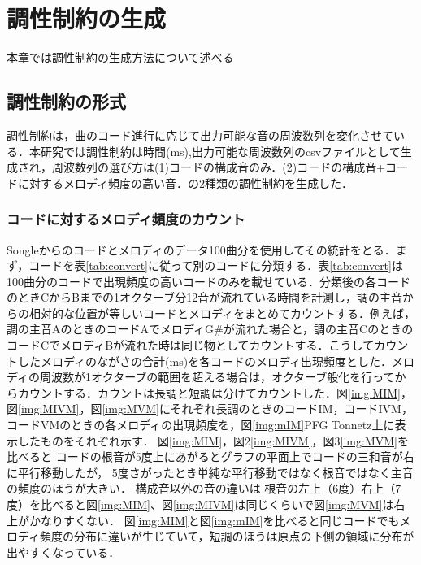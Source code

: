 \chapter{調性制約の生成}
本章では調性制約の生成方法について述べる
\section{調性制約の形式}
調性制約は，曲のコード進行に応じて出力可能な音の周波数列を変化させている．本研究では調性制約は時間(ms),出力可能な周波数列のcsvファイルとして生成され，周波数列の選び方は(1)コードの構成音のみ．(2)コードの構成音+コードに対するメロディ頻度の高い音．の2種類の調性制約を生成した．
\subsection{コードに対するメロディ頻度のカウント}
Songleからのコードとメロディのデータ100曲分を使用してその統計をとる．まず，コードを表\ref{tab:convert}に従って別のコードに分類する．表\ref{tab:convert}は100曲分のコードで出現頻度の高いコードのみを載せている．分類後の各コードのときCからBまでの1オクターブ分12音が流れている時間を計測し，調の主音からの相対的な位置が等しいコードとメロディをまとめてカウントする．例えば，調の主音AのときのコードAでメロディG\#が流れた場合と，調の主音CのときのコードCでメロディBが流れた時は同じ物としてカウントする．こうしてカウントしたメロディのながさの合計(ms)を各コードのメロディ出現頻度とした．メロディの周波数が1オクターブの範囲を超える場合は，オクターブ般化を行ってからカウントする．カウントは長調と短調は分けてカウントした．図\ref{img:MIM}，図\ref{img:MIVM}，図\ref{img:MVM}にそれぞれ長調のときのコードIM，コードIVM，コードVMのときの各メロディの出現頻度を，図\ref{img:mIM}PFG Tonnetz上に表示したものをそれぞれ示す．
図\ref{img:MIM}，図2\ref{img:MIVM}，図3\ref{img:MVM}を比べると
コードの根音が5度上にあがるとグラフの平面上でコードの三和音が右に平行移動したが，
5度さがったとき単純な平行移動ではなく根音ではなく主音の頻度のほうが大きい．
構成音以外の音の違いは
根音の左上（6度）右上（7度）を比べると図\ref{img:MIM}、図\ref{img:MIVM}は同じくらいで図\ref{img:MVM}は右上がかなりすくない．
図\ref{img:MIM}と図\ref{img:mIM}を比べると同じコードでもメロディ頻度の分布に違いが生じていて，短調のほうは原点の下側の領域に分布が出やすくなっている．
